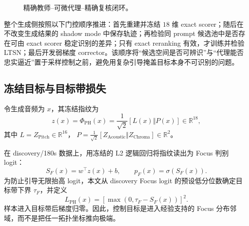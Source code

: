 \documentclass{article}
\begin{document}
\begin{figure}[htbp]
{%
}
\caption{精确教师--可微代理--精确复核闭环。}
\label{fig:acestep_pipeline}
\end{figure}

整个生成侧按照以下门控顺序推进：首先重建并冻结 $18$ 维 exact scorer；随后在不改变生成结果的 shadow mode 中保存轨迹；再检验同 prompt 候选池中是否存在可由 exact scorer 稳定识别的差异；只有 exact reranking 有效，才训练并检验 LTSN；最后开发弱梯度 corrector。该顺序将``候选空间是否可辨识''与``代理能否忠实逼近''置于采样控制之前，避免用复杂引导掩盖目标本身不可识别的问题。

\subsection{冻结目标与目标带损失}

令生成音频为 $x$，其冻结指纹为
\begin{equation}
z(x)=\Phi_{\mathrm{PH}}(x)
=\frac{1}{\sqrt{2}}\left[L(x)\Vert P(x)\right]\in\mathbb{R}^{18},
\end{equation}
其中 $L=Z_{\mathrm{Pitch}}\in\mathbb{R}^{16}$，
$P=\frac{1}{\sqrt{2}}[Z_{\mathrm{Acoustic}}\Vert
Z_{\mathrm{Chroma}}]\in\mathbb{R}^{2}$。

在 discovery/180s 数据上，用冻结的 L2 逻辑回归将指纹读出为 Focus 判别 logit：
\begin{equation}
S_F(x)=w^{\top}z(x)+b,\qquad p_F(x)=\sigma(S_F(x)).
\end{equation}
为防止引导无限抬高 logit，本文从 discovery Focus logit 的预设低分位数确定目标带下界 $\tau_F$，并定义
\begin{equation}
L_{\mathrm{PH}}(x)=\left[\max\left(0,\tau_F-S_F(x)\right)\right]^2.
\label{eq:focus_band_loss}
\end{equation}
样本进入目标带后梯度归零。因此，控制目标是进入经验支持的 Focus 分布邻域，而不是把任一拓扑坐标推向极端。
\end{document}
